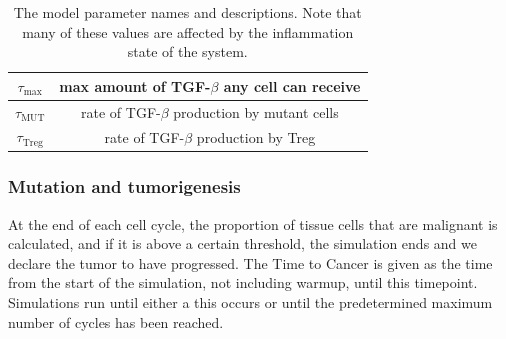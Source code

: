 \documentclass[11pt]{article}
\begin{document}
\begin{table}[H]
\begin{center}
\begin{tabular}{|| c | c||}
  \hline
 $\tau_\text{max}$ & max amount of TGF-$\beta$ any cell can receive \\
  \hline 
 $\tau_\text{MUT}$ & rate of TGF-$\beta$ production by mutant cells\\
  \hline
 $\tau_\text{Treg}$ & rate of TGF-$\beta$ production by Treg\\
  \hline
\end{tabular}
  \caption{The model parameter names and descriptions. Note that many of these values are affected by the inflammation state of the system.}
\end{center}
\end{table}

\subsubsection{Mutation and tumorigenesis}
At the end of each cell cycle, the proportion of tissue cells that are malignant is calculated, and if it is above a certain threshold, 
the simulation ends and we declare the tumor to have progressed.
The Time to Cancer is given as the time from the start of the simulation, not including warmup, until this timepoint.
Simulations run until either a this occurs or until the predetermined maximum number of cycles has been reached.
\end{document}
